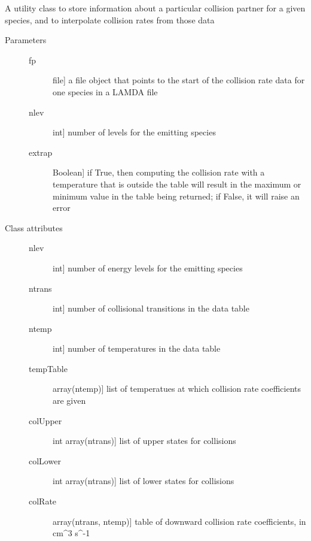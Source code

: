 \documentclass[letterpaper,10pt,english]{sphinxmanual}
\begin{document}
\begin{fulllineitems}
\label{fulldoc:despotic.collPartner}
A utility class to store information about a particular collision
partner for a given species, and to interpolate collision rates
from those data
\begin{description}
\item[{Parameters}] \leavevmode\begin{description}
\item[{fp}] \leavevmode{[}file{]}
a file object that points to the start of the collision
rate data for one species in a LAMDA file

\item[{nlev}] \leavevmode{[}int{]}
number of levels for the emitting species

\item[{extrap}] \leavevmode{[}Boolean{]}
if True, then computing the collision rate with a
temperature that is outside the table will result in the
maximum or minimum value in the table being returned; if
False, it will raise an error

\end{description}

\item[{Class attributes}] \leavevmode\begin{description}
\item[{nlev}] \leavevmode{[}int{]}
number of energy levels for the emitting species

\item[{ntrans}] \leavevmode{[}int{]}
number of collisional transitions in the data table

\item[{ntemp}] \leavevmode{[}int{]}
number of temperatures in the data table

\item[{tempTable}] \leavevmode{[}array(ntemp){]}
list of temperatues at which collision rate coefficients are
given

\item[{colUpper}] \leavevmode{[}int array(ntrans){]}
list of upper states for collisions

\item[{colLower}] \leavevmode{[}int array(ntrans){]}
list of lower states for collisions

\item[{colRate}] \leavevmode{[}array(ntrans, ntemp){]}
table of downward collision rate coefficients, in cm\textasciicircum{}3 s\textasciicircum{}-1


\end{description}
\end{description}
\end{fulllineitems}
\end{document}
